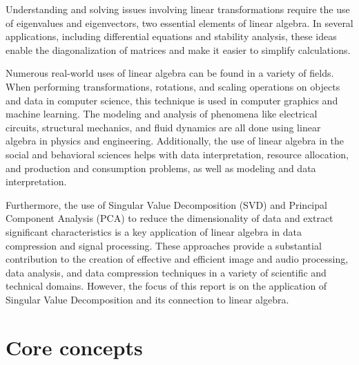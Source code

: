 \documentclass[a4paper]{article}
\begin{document}
{		Understanding and solving issues involving linear transformations require the use of eigenvalues and eigenvectors, two essential elements of linear algebra. In several applications, including differential equations and stability analysis, these ideas enable the diagonalization of matrices and make it easier to simplify calculations.
		
		Numerous real-world uses of linear algebra can be found in a variety of fields. When performing transformations, rotations, and scaling operations on objects and data in computer science, this technique is used in computer graphics and machine learning. The modeling and analysis of phenomena like electrical circuits, structural mechanics, and fluid dynamics are all done using linear algebra in physics and engineering. Additionally, the use of linear algebra in the social and behavioral sciences helps with data interpretation, resource allocation, and production and consumption problems, as well as modeling and data interpretation.
		
		Furthermore, the use of Singular Value Decomposition (SVD) and Principal Component Analysis (PCA) to reduce the dimensionality of data and extract significant characteristics is a key application of linear algebra in data compression and signal processing. These approaches provide a substantial contribution to the creation of effective and efficient image and audio processing, data analysis, and data compression techniques in a variety of scientific and technical domains. However, the focus of this report is on the application of Singular Value Decomposition and its connection to linear algebra.
		\newpage
		\section{Core concepts}
}
\end{document}
